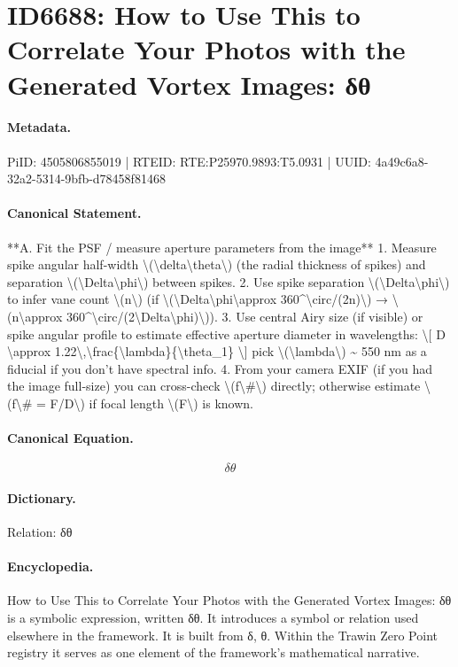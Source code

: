 \section*{ID6688: How to Use This to Correlate Your Photos with the Generated Vortex Images: δθ}
\paragraph{Metadata.}
PiID: 4505806855019 | RTEID: RTE:P25970.9893:T5.0931 | UUID: 4a49c6a8-32a2-5314-9bfb-d78458f81468

\paragraph{Canonical Statement.}
**A. Fit the PSF / measure aperture parameters from the image** 1. Measure spike angular half-width \textbackslash{}(\textbackslash{}delta\textbackslash{}theta\textbackslash{}) (the radial thickness of spikes) and separation \textbackslash{}(\textbackslash{}Delta\textbackslash{}phi\textbackslash{}) between spikes. 2. Use spike separation \textbackslash{}(\textbackslash{}Delta\textbackslash{}phi\textbackslash{}) to infer vane count \textbackslash{}(n\textbackslash{}) (if \textbackslash{}(\textbackslash{}Delta\textbackslash{}phi\textbackslash{}approx 360\textasciicircum{}\textbackslash{}circ/(2n)\textbackslash{}) → \textbackslash{}(n\textbackslash{}approx 360\textasciicircum{}\textbackslash{}circ/(2\textbackslash{}Delta\textbackslash{}phi)\textbackslash{})). 3. Use central Airy size (if visible) or spike angular profile to estimate effective aperture diameter in wavelengths: \textbackslash{}[ D \textbackslash{}approx 1.22\textbackslash{},\textbackslash{}frac\{\textbackslash{}lambda\}\{\textbackslash{}theta\_1\} \textbackslash{}] pick \textbackslash{}(\textbackslash{}lambda\textbackslash{}) \textasciitilde{} 550 nm as a fiducial if you don’t have spectral info. 4. From your camera EXIF (if you had the image full-size) you can cross-check \textbackslash{}(f\textbackslash{}\#\textbackslash{}) directly; otherwise estimate \textbackslash{}(f\textbackslash{}\# = F/D\textbackslash{}) if focal length \textbackslash{}(F\textbackslash{}) is known.

\paragraph{Canonical Equation.}
\[
\delta\theta
\]

\paragraph{Dictionary.}
Relation: δθ

\paragraph{Encyclopedia.}
How to Use This to Correlate Your Photos with the Generated Vortex Images: δθ is a symbolic expression, written δθ. It introduces a symbol or relation used elsewhere in the framework. It is built from δ, θ. Within the Trawin Zero Point registry it serves as one element of the framework's mathematical narrative.
